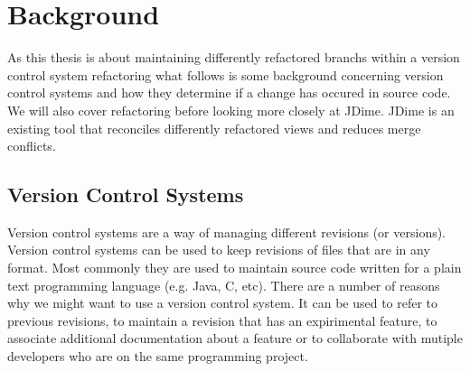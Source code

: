 \chapter{Background}

As this thesis is about maintaining differently refactored branchs within a version control system refactoring what follows is some background concerning version control systems and how they determine if a change has occured in source code.  We will also cover refactoring before looking more closely at JDime. JDime is an existing tool that reconciles differently refactored views and reduces merge conflicts. 


\section{Version Control Systems}
Version control systems are a way of managing different revisions (or versions). Version control systems can be used to keep revisions of files that are in any format. Most commonly they are used to maintain source code written for a plain text programming language (e.g. Java, C, etc).   There are a number of reasons why we might want to use a version control system. It can be used to refer to previous revisions, to maintain a revision that has an expirimental feature, to associate additional documentation about a feature or to collaborate with mutiple developers who are on the same programming project.


